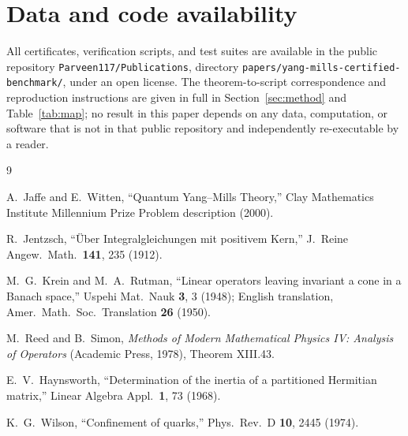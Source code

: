 \documentclass[aps,prd,twocolumn,superscriptaddress,nofootinbib]{revtex4-2}
\begin{document}
\section*{Data and code availability}

All certificates, verification scripts, and test suites are available in
the public repository \texttt{Parveen117/Publications}, directory
\texttt{papers/yang-mills-certified-benchmark/}, under an open license.
The theorem-to-script correspondence and reproduction instructions are
given in full in Section~\ref{sec:method} and Table~\ref{tab:map}; no
result in this paper depends on any data, computation, or software that
is not in that public repository and independently re-executable by a
reader.

\begin{thebibliography}{9}

A.~Jaffe and E.~Witten, ``Quantum Yang--Mills Theory,'' Clay Mathematics
Institute Millennium Prize Problem description (2000).

R.~Jentzsch, ``Über Integralgleichungen mit positivem Kern,''
J.\ Reine Angew.\ Math.\ \textbf{141}, 235 (1912).

M.~G.~Krein and M.~A.~Rutman, ``Linear operators leaving invariant a
cone in a Banach space,'' Uspehi Mat.\ Nauk \textbf{3}, 3 (1948);
English translation, Amer.\ Math.\ Soc.\ Translation \textbf{26} (1950).

M.~Reed and B.~Simon, \emph{Methods of Modern Mathematical Physics IV:
Analysis of Operators} (Academic Press, 1978), Theorem XIII.43.

E.~V.~Haynsworth, ``Determination of the inertia of a partitioned
Hermitian matrix,'' Linear Algebra Appl.\ \textbf{1}, 73 (1968).

K.~G.~Wilson, ``Confinement of quarks,'' Phys.\ Rev.\ D \textbf{10},
2445 (1974).

\end{thebibliography}
\end{document}

